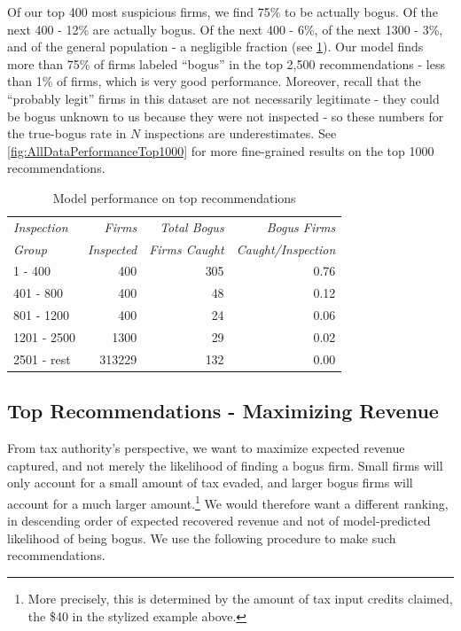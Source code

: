 Of our top 400 most suspicious firms, we find 75\% to be actually bogus. Of the next 400 - 12\% are actually bogus. Of the next 400 - 6\%, of the next 1300 - 3\%, and of the general population - a negligible fraction (see \cref{tab:AllTimeCVPerformance}). Our model finds more than 75\% of firms labeled ``bogus'' in the top 2,500 recommendations - less than 1\% of firms, which is very good performance. Moreover, recall that the ``probably legit'' firms in this dataset are not necessarily legitimate - they could be bogus unknown to us because they were not inspected - so these numbers for the true-bogus rate in $N$ inspections are underestimates. See \cref{fig:AllDataPerformanceTop1000} for more fine-grained results on the top 1000 recommendations.


\begin{table}
  \begin{tabular}{lrrr}
  	\toprule
	  {\small\textit{Inspection}}  & {\small\textit{Firms}}  &  {\small\textit{Total Bogus}}  &  {\small\textit{Bogus Firms}} \\
    {\small\textit{Group}} & {\small\textit{Inspected}} &{\small\textit{Firms Caught}} & {\small\textit{Caught/Inspection}}\\
    \midrule
              1 - 400 &              400 &                     305 &                           0.76 \\
            401 - 800 &              400 &                      48 &                           0.12 \\
            801 - 1200 &              400 &                      24 &                           0.06 \\
          1201 - 2500 &             1300 &                      29 &                           0.02 \\
          2501 - rest &           313229 &                     132 &                           0.00 \\
    \bottomrule
  \end{tabular}
  \caption{Model performance on top recommendations}
  \label{tab:AllTimeCVPerformance}
\end{table}
 
\subsection{Top Recommendations - Maximizing Revenue}
\label{subsec:top-recommendations-revenue}
From tax authority's perspective, we want to maximize expected revenue captured, and not merely the likelihood of finding a bogus firm. Small firms will only account for a small amount of tax evaded, and larger bogus firms will account for a much larger amount.\footnote{More precisely, this is determined by the amount of tax input credits claimed, the \$40 in the stylized example above.} We would therefore want a different ranking, in descending order of expected recovered revenue and not of model-predicted likelihood of being bogus. We use the following procedure to make such recommendations.

